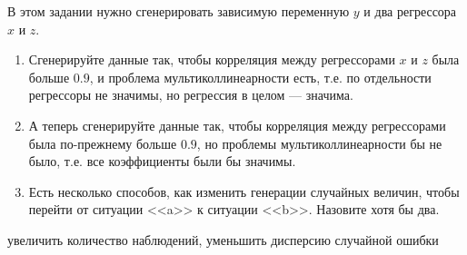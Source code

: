 \documentclass[pdftex,11pt,openany]{book}\usepackage[]{graphicx}\usepackage[]{color}
\begin{document}
\begin{problem}
В этом задании нужно сгенерировать зависимую переменную $y$ и два регрессора $x$ и $z$.
\begin{enumerate}
\item Сгенерируйте данные так, чтобы корреляция между регрессорами $x$ и $z$ была больше $0.9$, и проблема мультиколлинеарности есть, т.е. по отдельности регрессоры не значимы, но регрессия в целом --- значима.
\item А теперь сгенерируйте данные так, чтобы корреляция между регрессорами была по-прежнему больше $0.9$, но проблемы мультиколлинеарности бы не было, т.е. все коэффициенты были бы значимы.
\item Есть несколько способов, как изменить генерации случайных величин, чтобы перейти от ситуации <<a>> к ситуации <<b>>. Назовите хотя бы два.   
\end{enumerate}
\end{problem}
\begin{solution}
увеличить количество наблюдений, уменьшить дисперсию случайной ошибки
\end{solution}
\end{document}

